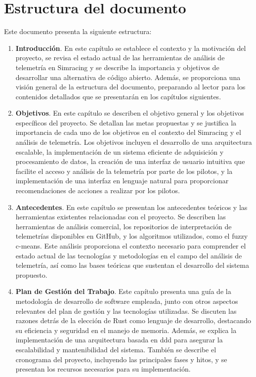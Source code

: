 \section{Estructura del documento}

Este documento presenta la siguiente estructura:

\begin{enumerate}
\item \textbf{Introducción}.
En este capítulo se establece el contexto y la motivación del proyecto, se revisa el estado actual de las herramientas de análisis de telemetría en Simracing y se describe la importancia y objetivos de desarrollar una alternativa de código abierto. Además, se proporciona una visión general de la estructura del documento, preparando al lector para los contenidos detallados que se presentarán en los capítulos siguientes.

\item \textbf{Objetivos}.
En este capítulo se describen el objetivo general y los objetivos específicos del proyecto. Se detallan las metas propuestas y se justifica la importancia de cada uno de los objetivos en el contexto del Simracing y el análisis de telemetría. Los objetivos incluyen el desarrollo de una arquitectura escalable, la implementación de un sistema eficiente de adquisición y procesamiento de datos, la creación de una interfaz de usuario intuitiva que facilite el acceso y análisis de la telemetría por parte de los pilotos, y la implementación de una interfaz en lenguaje natural para proporcionar recomendaciones de acciones a realizar por los pilotos.

\item \textbf{Antecedentes}.
En este capítulo se presentan los antecedentes teóricos y las herramientas existentes relacionadas con el proyecto. Se describen las herramientas de análisis comercial, los repositorios de interpretación de telemetrías disponibles en GitHub, y los algoritmos utilizados, como el fuzzy c-means. Este análisis proporciona el contexto necesario para comprender el estado actual de las tecnologías y metodologías en el campo del análisis de telemetría, así como las bases teóricas que sustentan el desarrollo del sistema propuesto.

\item \textbf{Plan de Gestión del Trabajo}.
Este capítulo presenta una guía de la metodología de desarrollo de software empleada, junto con otros aspectos relevantes del plan de gestión y las tecnologías utilizadas. Se discuten las razones detrás de la elección de Rust como lenguaje de desarrollo, destacando su eficiencia y seguridad en el manejo de memoria. Además, se explica la implementación de una arquitectura basada en \ac{ddd} para asegurar la escalabilidad y mantenibilidad del sistema. También se describe el cronograma del proyecto, incluyendo las principales fases y hitos, y se presentan los recursos necesarios para su implementación.


\end{enumerate}
